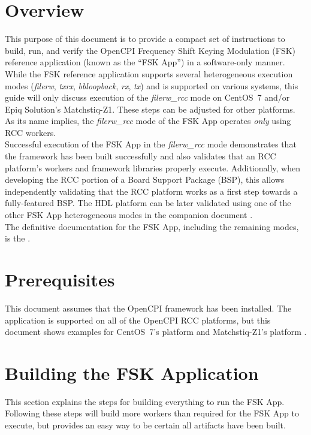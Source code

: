 \newpage
\begin{flushleft}
\section{Overview}
This purpose of this document is to provide a compact set of instructions to build, run, and verify the OpenCPI Frequency Shift Keying Modulation (FSK) reference application (known as the ``FSK App'') in a software-only manner.
While the FSK reference application supports several heterogeneous execution modes (\textit{filerw}, \textit{txrx}, \textit{bbloopback}, \textit{rx}, \textit{tx}) and is supported on various systems, this guide will only discuss execution of the \textit{filerw\_rcc} mode on CentOS~7 and/or Epiq Solution's Matchstiq-Z1.
These steps can be adjusted for other platforms. As its name implies, the \textit{filerw\_rcc} mode of the FSK App operates \textit{only} using RCC workers.
~\\ \medskip
Successful execution of the FSK App in the \textit{filerw\_rcc} mode demonstrates that the framework has been built successfully and also validates that an RCC platform's workers and framework libraries properly execute.
Additionally, when developing the RCC portion of a Board Support Package (BSP), this allows independently validating that the RCC platform works as a first step towards a fully-featured BSP.
The HDL platform can be later validated using one of the other FSK App heterogeneous modes in the companion document .
~\\ \medskip
The definitive documentation for the FSK App, including the remaining modes, is the .

\section{Prerequisites}
This document assumes that the OpenCPI framework has been installed.  The application is supported on all of the OpenCPI RCC platforms, but this document shows examples for CentOS~7's platform  and Matchstiq-Z1's platform .

\section{Building the FSK Application }
This section explains the steps for building everything to run the FSK App.  Following these steps will build more workers than required for the FSK App to execute, but provides an easy way to be certain all artifacts have been built.
\newcommand{\BuildRCCForPlatform}[1]{\texttt{ocpidev build {-}-rcc {-}-rcc-platform #1}}
\newcommand{\BuildProject}[1]{
}
\end{flushleft}
